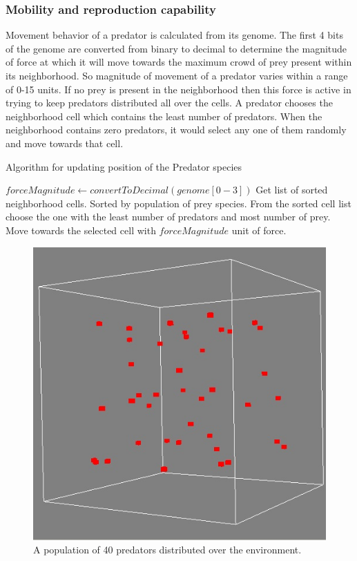 \documentclass[letterpaper]{article}
\numberwithin{equation}{section}
\begin{document}
\subsubsection{Mobility and reproduction capability}
Movement behavior of a predator is calculated from its genome. The first 4 bits of the genome are converted from binary to decimal to determine the magnitude of force at which it will move towards the maximum crowd of prey present within its neighborhood. So magnitude of movement of a predator varies within a range of 0-15 units. If no prey is present in the neighborhood then this force is active in trying to keep predators distributed all over the cells. A predator chooses the neighborhood cell which contains the least number of predators. When the neighborhood contains zero predators, it would select any one of them randomly and move towards that cell.

\begin{algorithm}[h]
	\caption{Algorithm for updating position of the Predator species}
	\label{algo:algorithm-movement-predator}
	\begin{algorithmic}
			\STATE $forceMagnitude \gets convertToDecimal(genome[0-3])$
			\STATE Get list of sorted neighborhood cells. Sorted by population of prey species.
			\STATE From the sorted cell list choose the one with the least number of predators and most number of prey.
			\STATE Move towards the selected cell with $forceMagnitude$ unit of force.
		\ENDFOR
	\end{algorithmic}
\end{algorithm}

\begin{figure}[h]
	\centering
	\includegraphics[scale=0.60]{../tex/images/predators-40}
	\caption[A population of predators]{A population of 40 predators distributed over the environment.}
	\label{fig:predators-40}
\end{figure}
\end{document}
